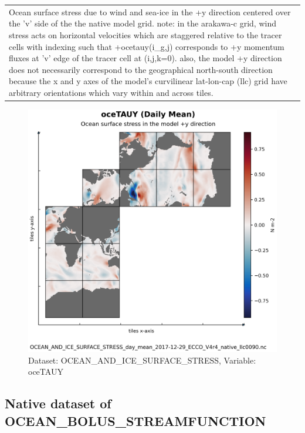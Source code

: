 \begin{longtable}{|m{}|m{}|m{}|m{}|}
\rowcolor{lightgray} \multicolumn{4}{|c|}{\textbf{Comments}} \\ \hline
\multicolumn{4}{|p{1\textwidth}|}{Ocean surface stress due to wind and sea-ice in the +y direction centered over the 'v' side of the the native model grid. note: in the arakawa-c grid, wind stress acts on horizontal velocities which are staggered relative to the tracer cells with indexing such that +ocetauy(i\_g,j) corresponds to +y momentum fluxes at 'v' edge of the tracer cell at (i,j,k=0). also, the model +y direction does not necessarily correspond to the geographical north-south direction because the x and y axes of the model's curvilinear lat-lon-cap (llc) grid have arbitrary orientations which vary within and across tiles.} \\ \hline
\end{longtable}

\begin{figure}[H]
\centering
\includegraphics[scale=0.55]{../images/plots/native_plots/Ocean_and_Sea-Ice_Surface_Stress/oceTAUY.png}
\caption{Dataset: OCEAN\_AND\_ICE\_SURFACE\_STRESS, Variable: oceTAUY}
\label{tab:table-OCEAN_AND_ICE_SURFACE_STRESS_oceTAUY-Plot}
\end{figure}
\subsection{Native dataset of OCEAN\_BOLUS\_STREAMFUNCTION}
\newp
